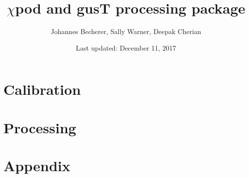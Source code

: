\documentclass[12pt]{report}
\title{$\chi$pod and gusT processing package}
\author{Johannes Becherer, Sally Warner, Deepak Cherian}
\date{Last updated: December 11, 2017}
\begin{document}
\pagestyle{fancy}
\maketitle

\tableofcontents

\part{Calibration}



\part{Processing}





\part{Appendix}



\end{document}
